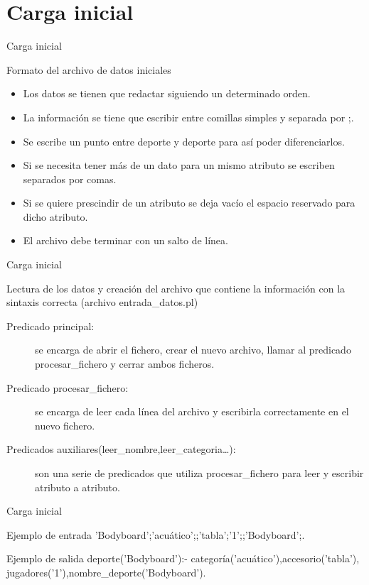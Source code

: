 \section{Carga inicial}


\begin{frame}{Carga inicial}
 \begin{block}{Formato del archivo de datos iniciales}
 \begin{itemize}
  \item Los datos se tienen que redactar siguiendo un determinado orden.
  \item La información se tiene que escribir entre comillas simples y separada por ;.
  \item Se escribe un punto entre deporte y deporte para así poder diferenciarlos.
  \item Si se necesita tener más de un dato para un mismo atributo se escriben separados por comas.
  \item Si se quiere prescindir de un atributo se deja vacío el espacio reservado para dicho atributo.
  \item El archivo debe terminar con un salto de línea.
 \end{itemize}
 \end{block}
\end{frame}

\begin{frame}{Carga inicial}
 \begin{block}{Lectura de los datos y creación del archivo que contiene la información con la sintaxis correcta (archivo entrada\_datos.pl)}
 \begin{description}
  \item [Predicado principal:]se encarga de abrir el fichero, crear el nuevo archivo, llamar al predicado procesar\_fichero y cerrar ambos ficheros.
  \item [Predicado procesar\_fichero:]se encarga de leer cada línea del archivo y escribirla correctamente en el nuevo fichero.
  \item [Predicados auxiliares(leer\_nombre,leer\_categoria\ldots):]son una serie de predicados que utiliza procesar\_fichero para leer y escribir atributo a atributo.
 \end{description}
 \end{block}
\end{frame}

\begin{frame}{Carga inicial}
 \begin{block}{Ejemplo de entrada}
'Bodyboard';'acuático';;'tabla';'1';;'Bodyboard';.
 \end{block}

 \begin{block}{Ejemplo de salida}
deporte('Bodyboard'):- categoría('acuático'),accesorio('tabla'),
		jugadores('1'),nombre\_deporte('Bodyboard').
 \end{block}
\end{frame}


